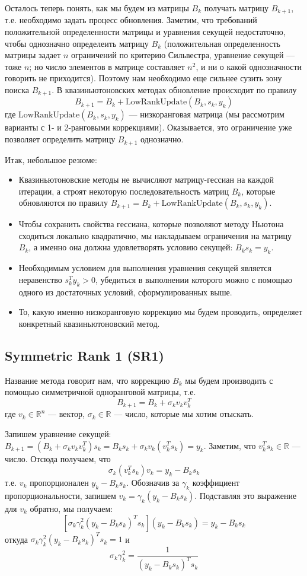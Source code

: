 \documentclass[a4paper, 12pt]{article}
\begin{document}
Осталось теперь понять, как мы будем из матрицы $B_k$ получать матрицу $B_{k+1}$, т.е. необходимо задать процесс обновления. Заметим, что требований положительной определенности матрицы и уравнения секущей недостаточно, чтобы однозначно определеить матрицу $B_k$ (положительная определенность матрицы задает $n$ ограничений по критерию Сильвестра, уравнение секущей --- тоже $n$; но число элементов в матрице составляет $n^2$, и ни о какой однозначности говорить не приходится). Поэтому нам необходимо еще сильнее сузить зону поиска $B_{k+1}$. В квазиньютоновских методах обновление происходит по правилу $$B_{k+1} = B_k + \mathrm{LowRankUpdate}(B_k, s_k, y_k)$$
где $\mathrm{LowRankUpdate}(B_k, s_k, y_k)$ --- низкоранговая матрица (мы рассмотрим варианты с 1- и 2-ранговыми коррекциями). Оказывается, это ограничение уже позволяет определить матрицу $B_{k+1}$ однозначно.

Итак, небольшое резюме:
\begin{itemize}
    \item Квазиньютоновские методы не вычисляют матрицу-гессиан на каждой итерации, а строят некоторую последовательность матриц $B_k$, которые обновляются по правилу $B_{k+1} = B_k + \mathrm{LowRankUpdate}(B_k, s_k, y_k)$.
    \item Чтобы сохранить свойства гессиана, которые позволяют методу Ньютона сходиться локально квадратично, мы накладываем ограничения на матрицу $B_k$, а именно она должна удовлетворять условию секущей: $B_k s_k = y_k$.
    \item Необходимым условием для выполнения уравнения секущей является неравенство $s_k^Ty_k > 0$, убедиться в выполнении которого можно с помощью одного из достаточных условий, сформулированных выше.
    \item То, какую именно низкоранговую коррекцию мы будем проводить, определяет конкретный квазиньютоновский метод.
\end{itemize}

\subsection{Symmetric Rank 1 (SR1)}
Название метода говорит нам, что коррекцию $B_k$ мы будем производить с помощью симметричной одноранговой матрицы, т.е.
$$B_{k+1} = B_k + \sigma_kv_kv_k^T$$
где $v_k \in \mathbb{R}^n$ --- вектор, $\sigma_k \in \mathbb{R}$ --- число, которые мы хотим отыскать.

Запишем уравнение секущей: $B_{k+1} = (B_k + \sigma_kv_kv_k^T)s_k = B_ks_k + \sigma_k v_k (v_k^Ts_k)= y_k$. Заметим, что $v_k^Ts_k \in \mathbb{R}$ --- число. Отсюда получаем, что $$\sigma_k(v_k^Ts_k)v_k = y_k - B_ks_k$$
т.е. $v_k$ пропорционален $y_k - B_ks_k$. Обозначив за $\gamma_k$ коэффициент пропорциональности, запишем $v_k = \gamma_k(y_k - B_ks_k)$. Подставляя это выражение для $v_k$ обратно, мы получаем:
$$\left[\sigma_k\gamma_k^2(y_k - B_ks_k)^Ts_k\right](y_k - B_ks_k) = y_k - B_ks_k$$
откуда $\sigma_k\gamma_k^2(y_k - B_ks_k)^Ts_k = 1$ и
$$\sigma_k\gamma_k^2 = \frac{1}{(y_k - B_ks_k)^Ts_k}$$
\end{document}
